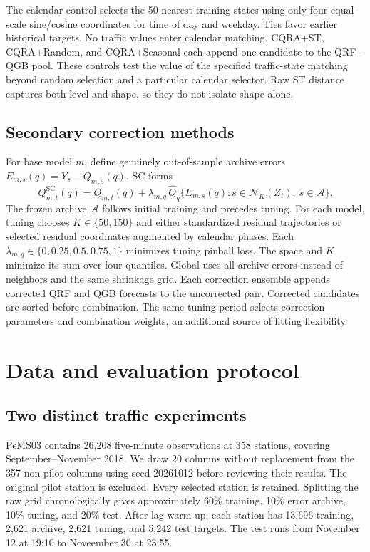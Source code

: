 \documentclass[11pt]{article}
\newcommand{\A}{\mathcal A}
\newcommand{\N}{\mathcal N}
\newcommand{\SC}{\mathrm{SC}}
\begin{document}
The calendar control selects the 50 nearest training states using only four equal-scale sine/cosine coordinates for time of day and weekday. Ties favor earlier historical targets. No traffic values enter calendar matching. CQRA+ST, CQRA+Random, and CQRA+Seasonal each append one candidate to the QRF--QGB pool. These controls test the value of the specified traffic-state matching beyond random selection and a particular calendar selector. Raw ST distance captures both level and shape, so they do not isolate shape alone.

\subsection{Secondary correction methods}
For base model $m$, define genuinely out-of-sample archive errors $E_{m,s}(q)=Y_s-Q_{m,s}(q)$. SC forms
\begin{equation}\label{eq:sc}
Q^{\SC}_{m,t}(q)=Q_{m,t}(q)+\lambda_{m,q}\,
\widehat Q_q\{E_{m,s}(q):s\in\N_K(Z_t),\ s\in\A\}.
\end{equation}
The frozen archive $\A$ follows initial training and precedes tuning. For each model, tuning chooses $K\in\{50,150\}$ and either standardized residual trajectories or selected residual coordinates augmented by calendar phases. Each $\lambda_{m,q}\in\{0,0.25,0.5,0.75,1\}$ minimizes tuning pinball loss. The space and $K$ minimize its sum over four quantiles. Global uses all archive errors instead of neighbors and the same shrinkage grid. Each correction ensemble appends corrected QRF and QGB forecasts to the uncorrected pair. Corrected candidates are sorted before combination. The same tuning period selects correction parameters and combination weights, an additional source of fitting flexibility.

\section{Data and evaluation protocol}
\subsection{Two distinct traffic experiments}
PeMS03 contains 26,208 five-minute observations at 358 stations, covering September--November 2018. We draw 20 columns without replacement from the 357 non-pilot columns using seed 20261012 before reviewing their results. The original pilot station is excluded. Every selected station is retained. Splitting the raw grid chronologically gives approximately 60\% training, 10\% error archive, 10\% tuning, and 20\% test. After lag warm-up, each station has 13,696 training, 2,621 archive, 2,621 tuning, and 5,242 test targets. The test runs from November 12 at 19:10 to Noveember 30 at 23:55.
\end{document}
